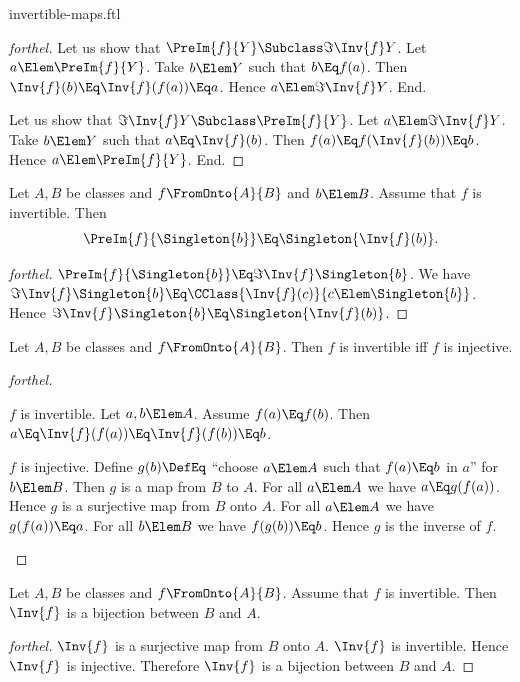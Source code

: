 \documentclass{stex}
\begin{document}
\begin{smodule}{invertible-maps.ftl}
\begin{proof}[forthel]
  Let us show that $\PreIm{f}{Y} \Subclass \Im{\Inv{f}}{Y}$.
    Let $a \Elem \PreIm{f}{Y}$.
    Take $b \Elem Y$ such that $b \Eq f(a)$.
    Then $\Inv{f}(b) \Eq \Inv{f}(f(a)) \Eq a$.
    Hence $a \Elem \Im{\Inv{f}}{Y}$.
  End.

  Let us show that $\Im{\Inv{f}}{Y} \Subclass \PreIm{f}{Y}$.
    Let $a \Elem \Im{\Inv{f}}{Y}$.
    Take $b \Elem Y$ such that $a \Eq \Inv{f}(b)$.
    Then $f(a) \Eq f(\Inv{f}(b)) \Eq b$.
    Hence $a \Elem \PreIm{f}{Y}$.
  End.
\end{proof}

\begin{proposition*}[forthel]
  Let $A, B$ be classes and $f \FromOnto{A}{B}$ and $b \Elem B$.
  Assume that $f$ is invertible.
  Then \[ \PreIm{f}{\Singleton{b}} \Eq \Singleton{\Inv{f}(b)}. \]
\end{proposition*}
\begin{proof}[forthel]
  $\PreIm{f}{\Singleton{b}} \Eq \Im{\Inv{f}}{\Singleton{b}}$.
  We have $\Im{\Inv{f}}{\Singleton{b}} \Eq \CClass{\Inv{f}(c)}{c \Elem \Singleton{b}}$.
  Hence $\Im{\Inv{f}}{\Singleton{b}} \Eq \Singleton{\Inv{f}(b)}$.
\end{proof}

\begin{proposition*}[forthel]
  Let $A, B$ be classes and $f \FromOnto{A}{B}$.
  Then $f$ is invertible iff $f$ is injective.
\end{proposition*}
\begin{proof}[forthel]
  \begin{case}{$f$ is invertible.}
    Let $a, b \Elem A$.
    Assume $f(a) \Eq f(b)$.
    Then $a \Eq \Inv{f}(f(a)) \Eq \Inv{f}(f(b)) \Eq b$.
  \end{case}

  \begin{case}{$f$ is injective.}
    Define $g(b) \DefEq$ ``choose $a \Elem A$ such that $f(a) \Eq b$ in $a$'' for
    $b \Elem B$.
    Then $g$ is a map from $B$ to $A$.
    For all $a \Elem A$ we have $a \Eq g(f(a))$.
    Hence $g$ is a surjective map from $B$ onto $A$.
    For all $a \Elem A$ we have $g(f(a)) \Eq a$.
    For all $b \Elem B$ we have $f(g(b)) \Eq b$.
    Hence $g$ is the inverse of $f$.
  \end{case}
\end{proof}

\begin{proposition*}[forthel]
  Let $A, B$ be classes and $f \FromOnto{A}{B}$.
  Assume that $f$ is invertible.
  Then $\Inv{f}$ is a bijection between $B$ and $A$.
\end{proposition*}
\begin{proof}[forthel]
  $\Inv{f}$ is a surjective map from $B$ onto $A$.
  $\Inv{f}$ is invertible.
  Hence $\Inv{f}$ is injective.
  Therefore $\Inv{f}$ is a bijection between $B$ and $A$.
\end{proof}


\end{smodule}
\end{document}
